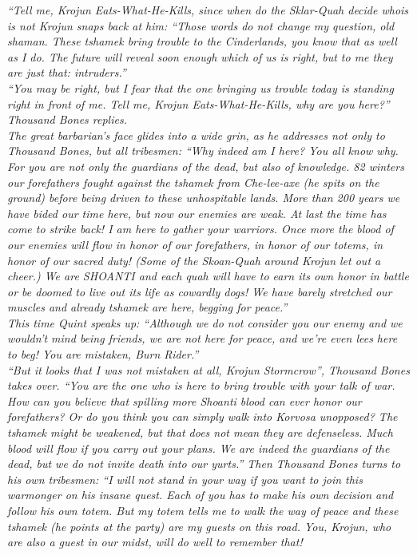 {\itshape``Tell me, Krojun Eats-What-He-Kills, since when do the Sklar-Quah decide whois is not Krojun snaps back at him: {\itshape``Those words do not change my question, old shaman. These tshamek bring trouble to the Cinderlands, you know that as well as I do. The future will reveal soon enough which of us is right, but to me they are just that: intruders.}''\\

{\itshape``You may be right, but I fear that the one bringing us trouble today is standing right in front of me. Tell me, Krojun Eats-What-He-Kills, why are you here?}'' Thousand Bones replies.\\

The great barbarian's face glides into a wide grin, as he addresses not only to Thousand Bones, but all tribesmen: {\itshape``Why indeed am I here? You all know why. For you are not only the guardians of the dead, but also of knowledge. 82 winters our forefathers fought against the tshamek from Che-lee-axe (he spits on the ground) before being driven to these unhospitable lands. More than 200 years we have bided our time here, but now our enemies are weak. At last the time has come to strike back! I am here to gather your warriors. Once more the blood of our enemies will flow in honor of our forefathers, in honor of our totems, in honor of our sacred duty! (Some of the Skoan-Quah around Krojun let out a cheer.) We are SHOANTI and each quah will have to earn its own honor in battle or be doomed to live out its life as cowardly dogs! We have barely stretched our muscles and already tshamek are here, begging for peace.}''\\

This time Quint speaks up: {\itshape``Although we do not consider you our enemy and we wouldn't mind being friends, we are not here for peace, and we're even lees here to beg! You are mistaken, Burn Rider.}''\\

{\itshape``But it looks that I was not mistaken at all, Krojun Stormcrow}'', Thousand Bones takes over. {\itshape``You are the one who is here to bring trouble with your talk of war. How can you believe that spilling more Shoanti blood can ever honor our forefathers? Or do you think you can simply walk into Korvosa unopposed? The tshamek might be weakened, but that does not mean they are defenseless. Much blood will flow if you carry out your plans. We are indeed the guardians of the dead, but we do not invite death into our yurts.}'' Then Thousand Bones turns to his own tribesmen: {\itshape``I will not stand in your way if you want to join this warmonger on his insane quest. Each of you has to make his own decision and follow his own totem. But my totem tells me to walk the way of peace and these tshamek (he points at the party) are my guests on this road. You, Krojun, who are also a guest in our midst, will do well to remember that!\\

}}
